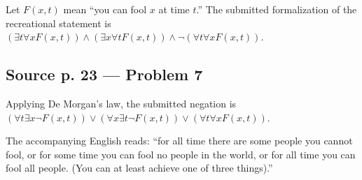 Let \(F\left( {x,t} \right)\) mean ``you can fool \(x\) at time \(t\).'' The submitted formalization of the recreational statement is \(\left( {\exists t\forall xF\left( {x,t} \right)} \right) \land \left( {\exists x\forall tF\left( {x,t} \right)} \right) \land \neg\left( {\forall t\forall xF\left( {x,t} \right)} \right)\).

\subsection{Source p. 23 --- Problem 7}

Applying De Morgan's law, the submitted negation is \(\left( {\forall t\exists x\neg F\left( {x,t} \right)} \right) \vee \left( {\forall x\exists t\neg F\left( {x,t} \right)} \right) \vee \left( {\forall t\forall xF\left( {x,t} \right)} \right)\).

The accompanying English reads: ``for all time there are some people you cannot fool, or for some time you can fool no people in the world, or for all time you can fool all people. (You can at least achieve one of three things).''
